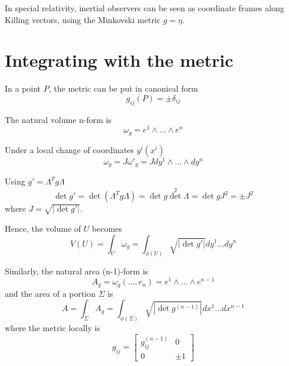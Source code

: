     In special relativity, inertial observers can be seen as coordinate frames along Killing vectors, using the Minkovski metric $g = \eta$.

\section{Integrating with the metric}

    In a point $P$, the metric can be put in canonical form 
    \begin{equation*}
        g_{ij} (P) = \pm \delta_{ij}
    \end{equation*}

    The natural volume n-form is 
    \begin{equation*}
        \omega_g = e^1 \wedge \ldots \wedge e^n
    \end{equation*}
    
    Under a local change of coordinates $y^i(x^i)$ 
    \begin{equation*}
        \omega_g = J {\omega'}_g = J dy^1 \wedge \ldots \wedge dy^n
    \end{equation*}

    Using $g' = \Lambda^T g \Lambda$
    \begin{equation*}
        \det g' = \det (\Lambda^T g \Lambda) = \det g \det^2 \Lambda = \det g J^2 = \pm J^2
    \end{equation*}
    where $J = \sqrt{|\det g'|}$.

    Hence, the volume of $U$ becomes 
    \begin{equation*}
        V(U) = \int_U \omega_g = \int_{\phi(U)} \sqrt{|\det g'|} dy^1 \ldots dy^n
    \end{equation*}

    Similarly, the natural area (n-1)-form is 
    \begin{equation*}
        A_g = \omega_g (\ldots, e_n) = e^1 \wedge \ldots \wedge e^{n-1}
    \end{equation*}
    and the area of a portion $\Sigma$ is 
    \begin{equation*}
        A = \int_{\Sigma} A_g = \int_{\phi(\Sigma)} \sqrt{|\det g^{(n-1)}|} dx^1 \ldots dx^{n-1}
    \end{equation*}
    where the metric locally is 
    \begin{equation*}
        g_{ij} = \begin{bmatrix}
            g_{ij}^{(n-1)} & 0 \\
            0 & \pm 1
        \end{bmatrix}
    \end{equation*}

